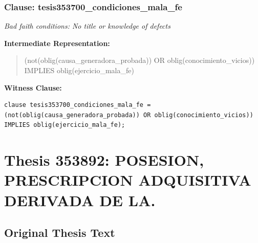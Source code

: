 \documentclass[11pt,a4paper]{article}
\begin{document}
\subsubsection{Clause: tesis353700\_condiciones\_mala\_fe}

\textit{Bad faith conditions: No title or knowledge of defects}

\textbf{Intermediate Representation:}

\begin{quote}
(not(oblig(causa\_generadora\_probada)) OR oblig(conocimiento\_vicios)) IMPLIES oblig(ejercicio\_mala\_fe)
\end{quote}

\textbf{Witness Clause:}

\begin{lstlisting}[style=witnessstyle, language=Witness]
clause tesis353700_condiciones_mala_fe = (not(oblig(causa_generadora_probada)) OR oblig(conocimiento_vicios)) IMPLIES oblig(ejercicio_mala_fe);
\end{lstlisting}

\newpage

\section{Thesis 353892: POSESION, PRESCRIPCION ADQUISITIVA DERIVADA DE LA.}
\label{thesis:353892}

\subsection{Original Thesis Text}
\end{document}
